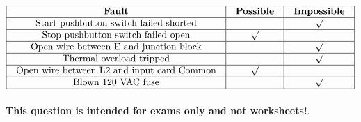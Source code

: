 






$$\vbox{\offinterlineskip
\halign{\strut
\vrule \quad\hfil # \ \hfil & 
\vrule \quad\hfil # \ \hfil & 
\vrule \quad\hfil # \ \hfil \vrule \cr
\noalign{\hrule}
%
{\bf Fault} & {\bf Possible} & {\bf Impossible} \cr
%
\noalign{\hrule}
%
Start pushbutton switch failed shorted &  & $\surd$ \cr
%
\noalign{\hrule}
%
Stop pushbutton switch failed open & $\surd$ &  \cr
%
\noalign{\hrule}
%
Open wire between E and junction block &  & $\surd$ \cr
%
\noalign{\hrule}
%
Thermal overload tripped &  & $\surd$ \cr
%
\noalign{\hrule}
%
Open wire between L2 and input card Common & $\surd$ &  \cr
%
\noalign{\hrule}
%
Blown 120 VAC fuse &  & $\surd$ \cr
%
\noalign{\hrule}
} %
}$$ %







{\bf This question is intended for exams only and not worksheets!}.


